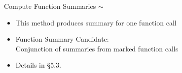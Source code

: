 \begin{frame}{Compute Function Summaries $\sim$}
\begin{itemize}
  \item This method produces summary for one function call
  \item<2-> Function Summary Candidate:\\
            {\color{red}Conjunction} of summaries from {\color{red}marked} function calls
  \item<2-> Details in \S 5.3.
\end{itemize}

\end{frame}
